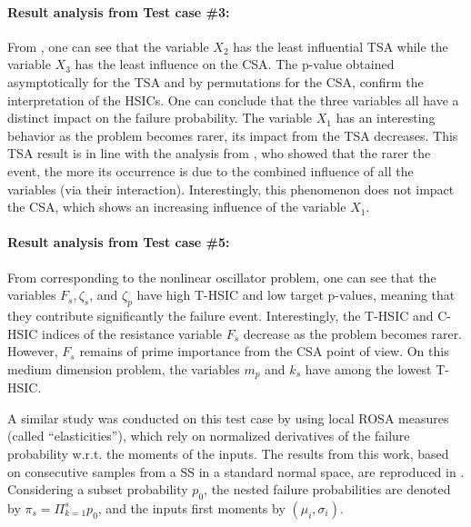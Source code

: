 \paragraph{Result analysis from Test case \#3:}

From , one can see that the variable $X_2$ has the least influential TSA while the variable $X_3$ has the least influence on the CSA. 
The p-value obtained asymptotically for the TSA and by permutations for the CSA, confirm the interpretation of the HSICs. 
One can conclude that the three variables all have a distinct impact on the failure probability. 
The variable $X_1$ has an interesting behavior as the problem becomes rarer, its impact from the TSA decreases.      
This TSA result is in line with the analysis from \citet{lemaitre_2015_PLI}, who showed that the rarer the event, the more its occurrence is due to the combined influence of all the variables (via their interaction). 
Interestingly, this phenomenon does not impact the CSA, which shows an increasing influence of the variable $X_1$. 


\paragraph{Result analysis from Test case \#5:}
From  corresponding to the nonlinear oscillator problem, one can see that the variables $F_s, \zeta_s$, and $\zeta_p$ have high T-HSIC and low target p-values, meaning that they contribute significantly the failure event.    
Interestingly, the T-HSIC and C-HSIC indices of the resistance variable $F_s$ decrease as the problem becomes rarer. 
However, $F_s$ remains of prime importance from the CSA point of view. 
On this medium dimension problem, the variables $m_p$ and $k_s$ have among the lowest T-HSIC. 

A similar study was conducted on this test case by \citet[Subsec. I-4.3.2]{bourinet_2018} using local ROSA measures (called ``elasticities''), which rely on normalized derivatives of the failure probability w.r.t. the moments of the inputs. 
The results from this work, based on consecutive samples from a SS in a standard normal space, are reproduced in . 
Considering a subset probability $p_0$, the nested failure probabilities are denoted by $\pi_s = \Pi_{k=1}^s p_0$, and the inputs first moments by $(\mu_i, \sigma_i)$. 

